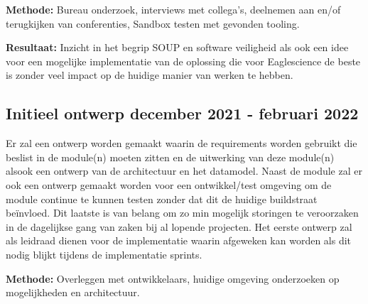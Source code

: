 \textbf{Methode:} Bureau onderzoek, interviews met collega's, deelnemen aan en/of terugkijken van conferenties, Sandbox testen met gevonden tooling.

\textbf{Resultaat:} Inzicht in het begrip SOUP en software veiligheid als ook een idee voor een mogelijke implementatie van de oplossing die voor Eaglescience de beste is zonder veel impact op de huidige manier van werken te hebben.

\subsection{Initieel ontwerp \textbf{december 2021 - februari 2022 }}\label{subsec:initieel-ontwerp}
Er zal een ontwerp worden gemaakt waarin de requirements worden gebruikt die beslist in de module(n) moeten zitten en de uitwerking van deze module(n) alsook een ontwerp van de architectuur en het datamodel. Naast de module zal er ook een ontwerp gemaakt worden voor een ontwikkel/test omgeving om de module continue te kunnen testen zonder dat dit de huidige buildstraat beïnvloed. Dit laatste is van belang om zo min mogelijk storingen te veroorzaken in de dagelijkse gang van zaken bij al lopende projecten. Het eerste ontwerp zal als leidraad dienen voor de implementatie waarin afgeweken kan worden als dit nodig blijkt tijdens de implementatie sprints.

\textbf{Methode:} Overleggen met ontwikkelaars, huidige omgeving onderzoeken op mogelijkheden en architectuur.

